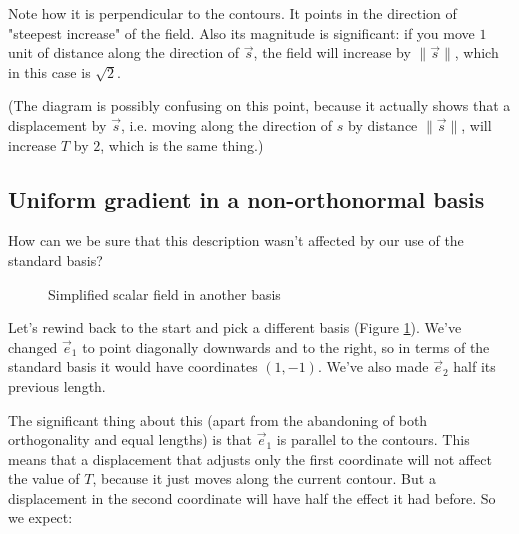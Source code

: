 Note how it is perpendicular to the contours. It points in the direction of "steepest increase" of the field. Also its magnitude is significant: if you move $1$ unit of distance along the direction of $\vec{s}$, the field will increase by $\|\vec{s}\|$, which in this case is $\sqrt{2}$.

(The diagram is possibly confusing on this point, because it actually shows that a displacement by $\vec{s}$, i.e. moving along the direction of $s$ by distance $\|\vec{s}\|$, will increase $T$ by $2$, which is the same thing.)

\subsection{Uniform gradient in a non-orthonormal basis}

How can we be sure that this description wasn't affected by our use of the standard basis?

\begin{figure}[h]
    \caption{Simplified scalar field in another basis}
    \centering
    \label{fig:scalar-field-awkward-basis}
\end{figure}

Let's rewind back to the start and pick a different basis (Figure \ref{fig:scalar-field-awkward-basis}). We've changed $\vec{e}_1$ to point diagonally downwards and to the right, so in terms of the standard basis it would have coordinates $(1, -1)$. We've also made $\vec{e}_2$ half its previous length.

The significant thing about this (apart from the abandoning of both orthogonality and equal lengths) is that $\vec{e}_1$ is parallel to the contours. This means that a displacement that adjusts only the first coordinate will not affect the value of $T$, because it just moves along the current contour. But a displacement in the second coordinate will have half the effect it had before. So we expect:

